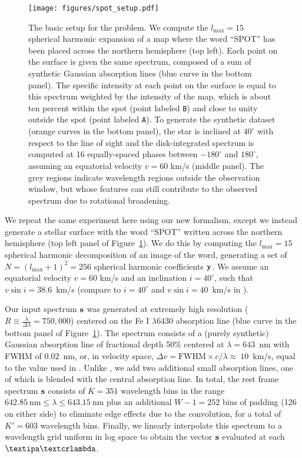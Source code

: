 \documentclass[modern]{aastex631}
\begin{document}
\begin{figure}[t!]
    \begin{centering}
        \texttt{[image: figures/spot\_setup.pdf]}
        \caption{%
            The basic setup for the \spot problem. 
            We compute the $l_\mathrm{max} = 15$ spherical harmonic expansion of a map where the word ``SPOT'' has been placed across the northern hemisphere (top left). 
            Each point on the surface is given the same spectrum, composed of a sum of synthetic Gaussian absorption lines (blue curve in the bottom panel).
            The specific intensity at each point on the surface is equal to this spectrum weighted by the intensity of the map, which is about ten percent within the spot (point labeled \texttt{B}) and close to unity outside the spot (point labeled \texttt{A}).
            To generate the synthetic dataset (orange curves in the bottom panel), the star is inclined at $40^\circ$ with respect to the line of sight and the disk-integrated spectrum is computed at 16 equally-spaced phases between $-180^\circ$ and $180^\circ$, assuming an equatorial velocity $v = 60$ km/s (middle panel).
            The grey regions indicate wavelength regions outside the observation window, but whose features can still contribute to the observed spectrum due to rotational broadening.
        }
        \label{fig:spot_setup}
    \end{centering}
\end{figure}

We repeat the same experiment here using our new formalism, except we instead generate a stellar surface with the word ``SPOT'' written across the northern hemisphere (top left panel of Figure~\ref{fig:spot_setup}).
We do this by computing the $l_\mathrm{max} = 15$ spherical harmonic decomposition of an image of the word, generating a set of $N = (l_\mathrm{max} + 1)^2 = 256$ spherical harmonic coefficients ${\mathbf{y}}$. 
We assume an equatorial velocity $v = 60$ km/s and an inclination $i = 40^\circ$, such that $v \sin i = 38.6$~km/s (compare to $i = 40^\circ$ and $v \sin i = 40$~km/s in \citealt{Vogt1987}).

Our input spectrum ${\mathbf{s}}$ was generated at extremely high resolution
%
($R \equiv \frac{\lambda}{\Delta\lambda} = 750,000$) 
%
centered on the Fe I $\lambda 6430$ absorption line (blue curve in the bottom panel of Figure~\ref{fig:spot_setup}).
%
The spectrum consists of a (purely synthetic) Gaussian absorption line of fractional depth 50\% centered at $\lambda = 643$~nm with FWHM of $0.02$~nm, or, in velocity space, $\Delta v = \mathrm{FWHM} \times c / \lambda \approx~10$~km/s, equal to the value used in \citet{Vogt1987}. 
%
Unlike \citet{Vogt1987}, we add two additional small absorption lines, one of which is blended with the central absorption line.
In total, the rest frame spectrum ${\mathbf{s}}$ consists of 
%
$K = 351$ 
%
wavelength bins in the range $642.85~\mathrm{nm} \leq \lambda \leq 643.15~\mathrm{nm}$ plus an additional
%
$W - 1 = 252$ 
%
bins of padding 
%
(126 on either side) 
%
to eliminate edge effects due to the convolution, for a total of 
%
$K' = 603$
%
wavelength bins. 
Finally, we linearly interpolate this spectrum to a wavelength grid uniform in log space to obtain the vector ${\mathbf{s}}$ evaluated at each $\lnlam$.
\end{document}
